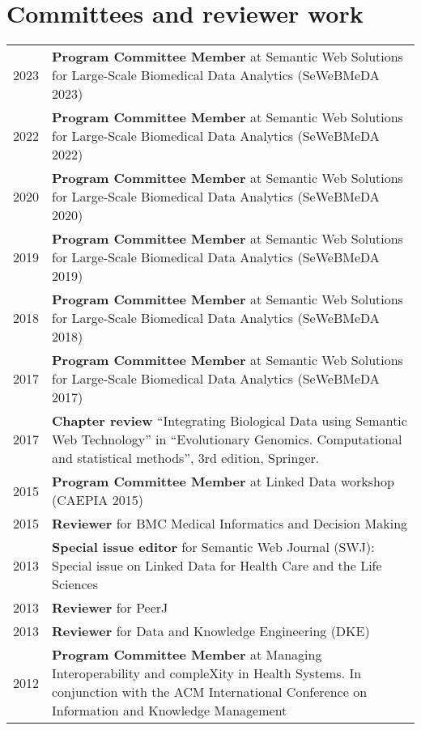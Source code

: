 \documentclass[11pt,fullpage]{article}
\begin{document}
\section*{Committees and reviewer work}


\begin{longtable}{p{0.5in}|p{5.5in}}
2023 & \textbf{Program Committee Member} at Semantic Web Solutions for Large-Scale Biomedical Data Analytics (SeWeBMeDA 2023) \\
2022 & \textbf{Program Committee Member} at Semantic Web Solutions for Large-Scale Biomedical Data Analytics (SeWeBMeDA 2022) \\
2020 & \textbf{Program Committee Member} at Semantic Web Solutions for Large-Scale Biomedical Data Analytics (SeWeBMeDA 2020) \\
2019 & \textbf{Program Committee Member} at Semantic Web Solutions for Large-Scale Biomedical Data Analytics (SeWeBMeDA 2019) \\  
2018 & \textbf{Program Committee Member} at Semantic Web Solutions for Large-Scale Biomedical Data Analytics (SeWeBMeDA 2018) \\
2017 & \textbf{Program Committee Member} at Semantic Web Solutions for Large-Scale Biomedical Data Analytics (SeWeBMeDA 2017) \\
2017 & \textbf{Chapter review} ``Integrating Biological Data using Semantic Web Technology'' in ``Evolutionary Genomics. Computational and statistical methods'', 3rd edition, Springer. \\
2015 & \textbf{Program Committee Member} at Linked Data workshop (CAEPIA 2015) \\
2015  & \textbf{Reviewer} for BMC Medical Informatics and Decision Making \\
2013 & {\bf Special issue editor} for Semantic Web Journal (SWJ): Special issue on Linked Data for Health Care and the Life Sciences \\
2013  & \textbf{Reviewer} for PeerJ \\
2013  & \textbf{Reviewer} for Data and Knowledge Engineering (DKE) \\
2012 & \textbf{Program Committee Member} at Managing Interoperability and compleXity in Health Systems. In conjunction with the ACM International Conference on Information and Knowledge Management\\

\end{longtable}
\end{document}

